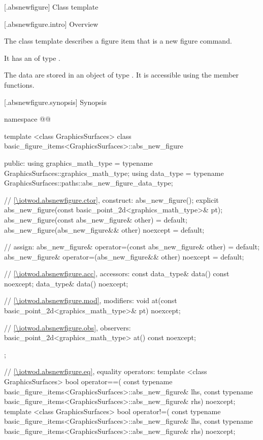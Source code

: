  [\iotwod.absnewfigure] {Class template }

 [\iotwod.absnewfigure.intro] {Overview}

\pnum
{}%
The class template  describes a figure item that is a new figure command.

%
\pnum
It has an  of type .

\pnum
The data are stored in an object of type . It is accessible using the  member functions.

 [\iotwod.absnewfigure.synopsis] {Synopsis}
\begin{codeblock}
namespace @\fullnamespace{}@ {
  template <class GraphicsSurfaces>
  class basic_figure_items<GraphicsSurfaces>::abs_new_figure {
  public:
    using graphics_math_type = typename GraphicsSurfaces::graphics_math_type;
    using data_type =
      typename GraphicsSurfaces::paths::abs_new_figure_data_type;

    // \ref{\iotwod.absnewfigure.ctor}, construct:
    abs_new_figure();
    explicit abs_new_figure(const basic_point_2d<graphics_math_type>& pt);
    abs_new_figure(const abs_new_figure& other) = default;
    abs_new_figure(abs_new_figure&& other) noexcept = default;

    // assign:
    abs_new_figure& operator=(const abs_new_figure& other) = default;
    abs_new_figure& operator=(abs_new_figure&& other) noexcept = default;

    // \ref{\iotwod.absnewfigure.acc}, accessors:
    const data_type& data() const noexcept;
    data_type& data() noexcept;

    // \ref{\iotwod.absnewfigure.mod}, modifiers:
    void at(const basic_point_2d<graphics_math_type>& pt) noexcept;

    // \ref{\iotwod.absnewfigure.obs}, observers:
    basic_point_2d<graphics_math_type> at() const noexcept;
  };
  
  // \ref{\iotwod.absnewfigure.eq}, equality operators:
  template <class GraphicsSurfaces>
  bool operator==(
    const typename basic_figure_items<GraphicsSurfaces>::abs_new_figure& lhs,
    const typename basic_figure_items<GraphicsSurfaces>::abs_new_figure& rhs) 
    noexcept;  
  template <class GraphicsSurfaces>
  bool operator!=(
    const typename basic_figure_items<GraphicsSurfaces>::abs_new_figure& lhs,
    const typename basic_figure_items<GraphicsSurfaces>::abs_new_figure& rhs) 
    noexcept;  
}
\end{codeblock}

